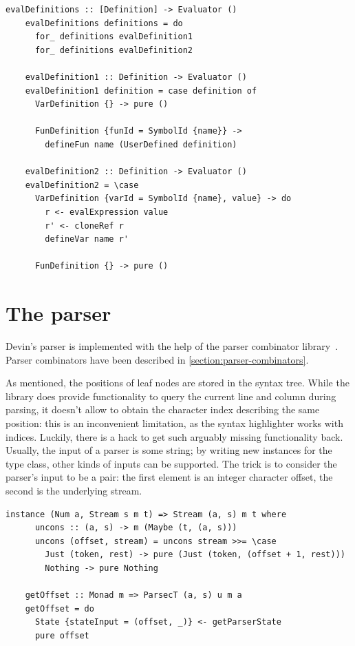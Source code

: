 \documentclass[UdineBachThesis,american,11pt]{PhdThesis}
\begin{document}
  \begin{lstlisting}[gobble=4,basicstyle=\ttfamily\small]
    evalDefinitions :: [Definition] -> Evaluator ()
    evalDefinitions definitions = do
      for_ definitions evalDefinition1
      for_ definitions evalDefinition2

    evalDefinition1 :: Definition -> Evaluator ()
    evalDefinition1 definition = case definition of
      VarDefinition {} -> pure ()

      FunDefinition {funId = SymbolId {name}} ->
        defineFun name (UserDefined definition)

    evalDefinition2 :: Definition -> Evaluator ()
    evalDefinition2 = \case
      VarDefinition {varId = SymbolId {name}, value} -> do
        r <- evalExpression value
        r' <- cloneRef r
        defineVar name r'

      FunDefinition {} -> pure ()
  \end{lstlisting}

  \section{The parser}

  Devin's parser is implemented with the help of the \lstinline@parsec@ parser
  combinator library~\cite{parsec}. Parser combinators have been described in
  \autoref{section:parser-combinators}.

  As mentioned, the positions of leaf nodes are stored in the syntax tree. While
  the \lstinline@parsec@ library does provide functionality to query the current
  line and column during parsing, it doesn't allow to obtain the character index
  describing the same position: this is an inconvenient limitation, as the
  syntax highlighter works with indices. Luckily, there is a hack to get such
  arguably missing functionality back. Usually, the input of a
  \lstinline@parsec@ parser is some string; by writing new instances for the
  \lstinline@Stream@ type class, other kinds of inputs can be supported. The
  trick is to consider the parser's input to be a pair: the first element is an
  integer character offset, the second is the underlying stream.

  \begin{lstlisting}[gobble=4,basicstyle=\ttfamily\small]
    instance (Num a, Stream s m t) => Stream (a, s) m t where
      uncons :: (a, s) -> m (Maybe (t, (a, s)))
      uncons (offset, stream) = uncons stream >>= \case
        Just (token, rest) -> pure (Just (token, (offset + 1, rest)))
        Nothing -> pure Nothing

    getOffset :: Monad m => ParsecT (a, s) u m a
    getOffset = do
      State {stateInput = (offset, _)} <- getParserState
      pure offset
  \end{lstlisting}
\end{document}

